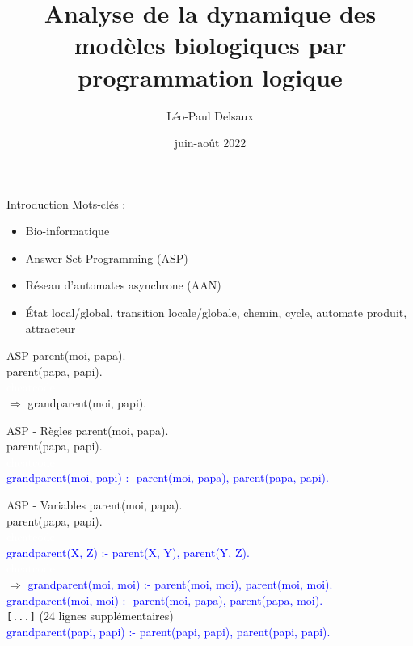 \documentclass{beamer}
\title{Analyse de la dynamique des modèles biologiques par programmation logique}
\author{Léo-Paul Delsaux}
\institute{Stage effectué au laboratoire CRIStAL de Villeneuve-d'Ascq}
\date{juin-août 2022}
\begin{document}
\maketitle

\begin{frame}{Introduction}
	Mots-clés :
	\begin{itemize}
		\item Bio-informatique
		\item Answer Set Programming (ASP)
		\item Réseau d'automates asynchrone (AAN)
		\item \'Etat local/global, transition locale/globale, chemin, cycle, automate produit, attracteur
	\end{itemize}
\end{frame}

\begin{frame}{ASP}
	\pause
	parent(moi, papa).\\
	\pause
	parent(papa, papi).\\
	\textcolor{white}{cheatcode}\\
	\pause
	$\Rightarrow$ grandparent(moi, papi).
\end{frame}

\begin{frame}{ASP - Règles}
	parent(moi, papa).\\
	parent(papa, papi).\\
	\textcolor{white}{cheatcode}\\
	\pause
	\textcolor{blue}{grandparent(moi, papi) :- parent(moi, papa), parent(papa, papi).}\\	
\end{frame}

\begin{frame}{ASP - Variables}
	parent(moi, papa).\\
	parent(papa, papi).\\
	\textcolor{white}{cheatcode}\\
	\pause
	\textcolor{blue}{grandparent(X, Z) :- parent(X, Y), parent(Y, Z).}\\
	\textcolor{white}{cheatcode}\\
	\pause
	$\Rightarrow$ \textcolor{blue}{grandparent(moi, moi) :- parent(moi, moi), parent(moi, moi).}\\
		      \textcolor{blue}{grandparent(moi, moi) :- parent(moi, papa), parent(papa, moi).}\\
		      \verb![...]! (24 lignes supplémentaires)\\
		      \textcolor{blue}{grandparent(papi, papi) :- parent(papi, papi), parent(papi, papi).}
\end{frame}
\end{document}
